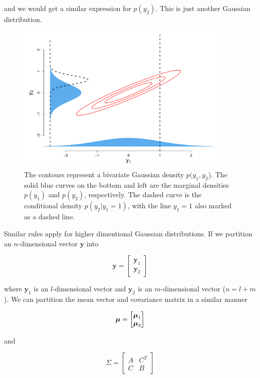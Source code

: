\documentclass[a4paper, 11pt, amsmath, graphicx]{article}\usepackage[]{graphicx}\usepackage[]{color}
\def\bmu{{\mbox{\boldmath $\mu$}}}
\begin{document}
and we would get a similar expression for $p(y_2)$. This is just another Gaussian distribution.

\begin{figure}
  \centering
  \includegraphics[width = 4in]{Gaussian2d.pdf}
  \caption{The contours represent a bivariate Gaussian density $p(y_1, y_2$). The solid blue curves on the bottom and left are the marginal densities $p(y_1)$ and $p(y_2)$, respectively. The dashed curve is the conditional density $p(y_2|y_1=1)$, with the line $y_1 = 1$ also marked as a dashed line.}
\end{figure}

Similar rules apply for higher dimentional Gaussian distributions. If we partition an $n$-dimensional vector $\mathbf{y}$ into

\begin{equation}
\mathbf{y} = \left[ \begin{matrix} \mathbf{y}_1 \\ \mathbf{y}_2 \end{matrix} \right]
\end{equation}

where $\mathbf{y}_1$ is an $l$-dimensional vector and $\mathbf{y}_2$ is an $m$-dimensional vector ($n = l + m$). We can partition the mean vector and covariance matrix in a similar manner

\begin{equation}
\bmu = \left[ \begin{matrix} \bmu_1 \\ \bmu_2 \end{matrix} \right]
\end{equation}

and

\begin{equation}
  \Sigma = \left[ \begin{matrix}
  A & C^T \\
  C & B
  \end{matrix} \right]
\end{equation}
\end{document}
